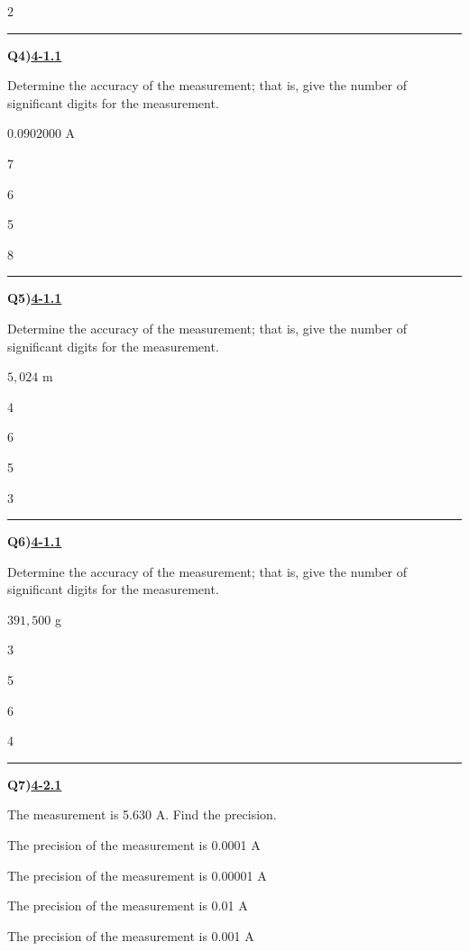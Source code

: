\documentclass[11pt]{article}
\newenvironment{Qbox}[2]{%
  \par\medskip\noindent\begin{minipage}{\linewidth}%
  \hrule\medskip%
  \textbf{Q#1)}\hfill\textbf{\underline{#2}}\par\smallskip%
}{\par\end{minipage}\par\medskip}
\begin{document}
\begin{multicols}{2}
\begin{Qbox}{4}{4-1.1}
Determine the accuracy of the measurement; that is, give the number of significant digits for the measurement.\par\medskip $0.0902000$ A
\begin{choices}
  \item 7
  \item 6
  \item 5
  \item 8
\end{choices}
\end{Qbox}

\begin{Qbox}{5}{4-1.1}
Determine the accuracy of the measurement; that is, give the number of significant digits for the measurement.\par\medskip $5{,}024$ m
\begin{choices}
  \item 4
  \item 6
  \item 5
  \item 3
\end{choices}
\end{Qbox}

\begin{Qbox}{6}{4-1.1}
Determine the accuracy of the measurement; that is, give the number of significant digits for the measurement.\par\medskip $391{,}500$ g
\begin{choices}
  \item 3
  \item 5
  \item 6
  \item 4
\end{choices}
\end{Qbox}

\begin{Qbox}{7}{4-2.1}
The measurement is 5.630 A. Find the precision.
\begin{choices}
  \item The precision of the measurement is 0.0001 A
  \item The precision of the measurement is 0.00001 A
  \item The precision of the measurement is 0.01 A
  \item The precision of the measurement is 0.001 A
\end{choices}
\end{Qbox}


\end{multicols}
\end{document}
